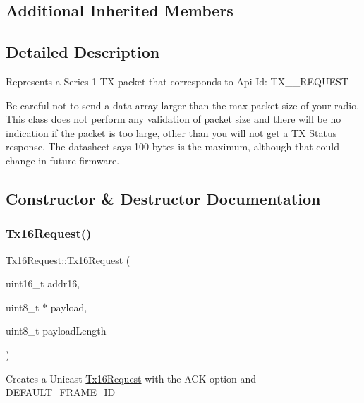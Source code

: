 \subsection*{Additional Inherited Members}


\subsection{Detailed Description}
Represents a Series 1 TX packet that corresponds to Api Id\+: T\+X\+\_\+\_\+\+R\+E\+Q\+U\+E\+ST 

Be careful not to send a data array larger than the max packet size of your radio. This class does not perform any validation of packet size and there will be no indication if the packet is too large, other than you will not get a TX Status response. The datasheet says 100 bytes is the maximum, although that could change in future firmware. 

\subsection{Constructor \& Destructor Documentation}
\hypertarget{class_tx16_request_a760e2c31996673e816fb3576748f731f}{}\label{class_tx16_request_a760e2c31996673e816fb3576748f731f} 
\subsubsection{\texorpdfstring{Tx16\+Request()}{Tx16Request()}\hspace{0.1cm}{\footnotesize\ttfamily [1/2]}}
{\footnotesize\ttfamily Tx16\+Request\+::\+Tx16\+Request (\begin{DoxyParamCaption}\item[{uint16\+\_\+t}]{addr16,  }\item[{uint8\+\_\+t $\ast$}]{payload,  }\item[{uint8\+\_\+t}]{payload\+Length }\end{DoxyParamCaption})}

Creates a Unicast \hyperlink{class_tx16_request}{Tx16\+Request} with the A\+CK option and D\+E\+F\+A\+U\+L\+T\+\_\+\+F\+R\+A\+M\+E\+\_\+\+ID \hypertarget{class_tx16_request_adcdbb644e08788267fb86cbefde76b1b}{}\label{class_tx16_request_adcdbb644e08788267fb86cbefde76b1b} 
